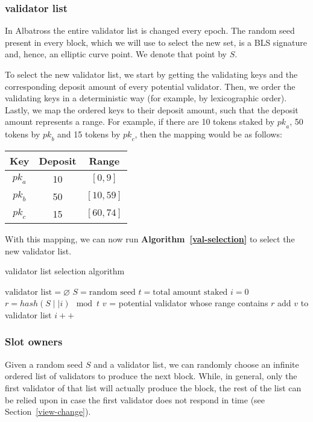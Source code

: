 \documentclass[conference]{IEEEtran}
\begin{document}
\subsubsection{validator list}
In Albatross the entire validator list is changed every epoch. The random seed present in every block, which we will use to select the new set, is a BLS signature and, hence, an elliptic curve point. We denote that point by $S$.

To select the new validator list, we start by getting the validating keys and the corresponding deposit amount of every potential validator. Then, we order the validating keys in a deterministic way (for example, by lexicographic order). Lastly, we map the ordered keys to their deposit amount, such that the deposit amount represents a range. For example, if there are 10 tokens staked by $\textit{pk}_a$, 50 tokens by $\textit{pk}_b$ and 15 tokens by $\textit{pk}_c$, then the mapping would be as follows:

\begin{center}
	\begin{tabular}{ c | c | c }
		Key & Deposit & Range \\
		\hline
		$\textit{pk}_a$ & 10 & $[0, 9]$ \\
		$\textit{pk}_b$ & 50 & $[10, 59]$ \\
		$\textit{pk}_c$ & 15 & $[60, 74]$ \\
	\end{tabular}
\end{center}

With this mapping, we can now run \textbf{Algorithm~\ref{val-selection}} to select the new validator list.

\begin{algorithm}
	\caption{validator list selection algorithm}
	\label{val-selection}
	\begin{algorithmic}[0]
		\State $\text{validator list} = \varnothing$
		\State $S= \text{random seed}$
		\State $t = \text{total amount staked}$
		\State $i=0$
			\State $r= hash(S \mid\mid i) \mod t$
			\State $v$ = potential validator whose range contains $r$
			\State add $v$ to validator list
			\State $i++$
		\EndWhile
	\end{algorithmic}
\end{algorithm}

\subsubsection{Slot owners}
Given a random seed $S$ and a validator list, we can randomly choose an infinite ordered list of validators to produce the next block. While, in general, only the first validator of that list will actually produce the block, the rest of the list can be relied upon in case the first validator does not respond in time (see Section~\ref{view-change}).
\end{document}
